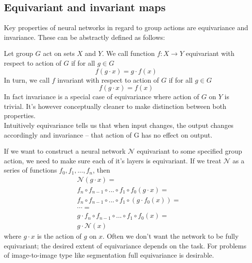     \subsection{Equivariant and invariant maps}
    \hspace{0.5cm}
     Key properties of neural networks in regard to group actions are equivariance and invariance.
        These can be abstractly defined as follows: \par
        Let group $G$ act on sets $X$ and $Y$. We call function $f: X \rightarrow Y$ equivariant
        with respect to action of $G$ if for all $g \in G$
        \begin{equation}
            f(g \cdot x) = g \cdot f(x)
        \end{equation}
        In turn, we call $f$ invariant with respect to action of $G$ if for all $g \in G$
        \begin{equation}
            f(g \cdot x) = f(x)
        \end{equation}
        In fact invariance is a special case of equivariance where action of $G$ on $Y$ is trivial.
        It's however conceptually cleaner to make distinction between both properties.\\
        Intuitively equivariance tells us that when input changes, the output changes accordingly
        and invariance -- that action of G has no effect on output.\par
            If we want to construct a neural network $\mathcal{N}$ equivariant to some
        specified group action, we need to make sure each of it's layers is equivariant.
        If we treat $\mathcal{N}$ as a series of functions $f_0,f_1,...,f_n$, then
        \begin{align*}
            & \mathcal{N}(g \cdot x) = \\
            & f_n \circ f_{n-1} \circ ... \circ f_1 \circ f_0(g\cdot x) =  \\
            & f_n \circ f_{n-1} \circ ... \circ f_1 \circ \left( g \cdot f_0(x) \right) = \\
            & \cdots = \\
            & g \cdot f_n \circ f_{n-1} \circ ... \circ f_1 \circ f_0(x) = \\
            & g \cdot \mathcal{N}(x)
        \end{align*}
        where $g\cdot x$ is the action of $g$ on $x$. Often we don't want the network
        to be fully equivariant; the desired extent of equivariance depends on the task.
        For problems of image-to-image type like segmentation full equivariance is desirable.
